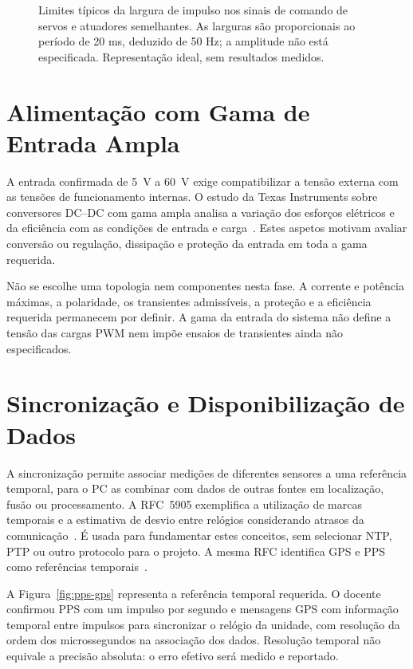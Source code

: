 \begin{figure}[htbp]
    \centering
    \caption[Largura de impulso e frequência PWM.]{Limites típicos da largura de impulso nos sinais de comando de servos e atuadores semelhantes. As larguras são proporcionais ao período de 20 ms, deduzido de 50 Hz; a amplitude não está especificada. Representação ideal, sem resultados medidos.}
    \label{fig:pwm}
\end{figure}

\section{Alimentação com Gama de Entrada Ampla}
\label{sec:alimentacao}

A entrada confirmada de 5~V a 60~V exige compatibilizar a tensão externa
com as tensões de funcionamento internas. O estudo da Texas Instruments
sobre conversores DC--DC com gama ampla analisa a variação dos esforços
elétricos e da eficiência com as condições de entrada e
carga~\cite{ti_wide_input_2013}. Estes aspetos motivam avaliar conversão
ou regulação, dissipação e proteção da entrada em toda a gama requerida.

Não se escolhe uma topologia nem componentes nesta fase. A corrente e
potência máximas, a polaridade, os transientes admissíveis, a proteção
e a eficiência requerida permanecem por definir. A gama da entrada do
sistema não define a tensão das cargas PWM nem impõe ensaios de
transientes ainda não especificados.

\section{Sincronização e Disponibilização de Dados}
\label{sec:sincronizacao-dados}

A sincronização permite associar medições de diferentes sensores a
uma referência temporal, para o PC as combinar com dados de outras
fontes em localização, fusão ou processamento. A RFC~5905
exemplifica a utilização de marcas temporais e a estimativa de desvio
entre relógios considerando atrasos da comunicação~\cite{mills_ntp_2010}.
É usada para fundamentar estes conceitos, sem selecionar NTP, PTP ou
outro protocolo para o projeto. A mesma RFC identifica GPS e PPS como
referências temporais~\cite[sec.~7.3]{mills_ntp_2010}.

A Figura~\ref{fig:pps-gps} representa a referência temporal requerida.
O docente confirmou PPS com um impulso por segundo e mensagens GPS
com informação temporal entre impulsos para sincronizar o relógio da
unidade, com resolução da ordem dos microssegundos na associação dos
dados. Resolução temporal não equivale a precisão absoluta: o erro
efetivo será medido e reportado.

